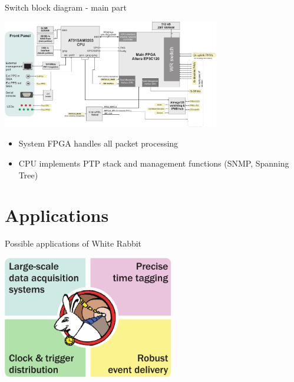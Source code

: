 \documentclass[xcolor=dvipsnames]{beamer}
\begin{document}
\begin{frame}{Switch block diagram - main part}
\begin{center}
\includegraphics[width=9.5cm]{../../figures/switch/wrs2_fpga_diagram.pdf}
\end{center}
\begin{itemize}
\item System FPGA handles all packet processing
\item CPU implements PTP stack and management functions (SNMP, Spanning Tree)
\end{itemize}
\end{frame}

\section{Applications}

\begin{frame}{Possible applications of White Rabbit}
\begin{center}
\includegraphics[width=7.5cm]{../../figures/applications/wr_apps.pdf}
\end{center}
\end{frame}
\end{document}
